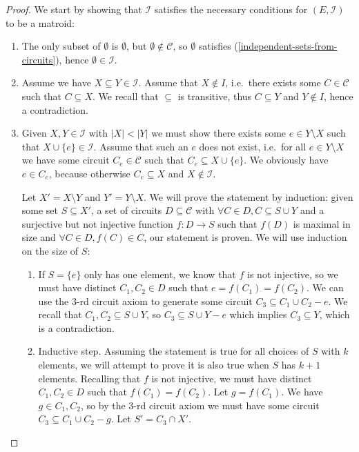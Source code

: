 \begin{proof} We start by showing that $\mathcal I $ satisfies the necessary conditions for $(E, \mathcal I )$ to be a matroid:
    \begin{enumerate} 
        \item The only subset of $\emptyset $ is $ \emptyset $, but $ \emptyset \not\in \mathcal C $, so $ \emptyset $ satisfies (\ref{independent-sets-from-circuits}), hence $\emptyset \in \mathcal I$.
    \item Assume we have $X \subseteq Y \in \mathcal I$. Assume that $X \not\in I$, i.e.\ there exists some $C \in \mathcal C $ such that $C \subseteq X$. We recall that $\subseteq $ is transitive, thus $C \subseteq Y$ and $Y \not\in I$, hence a contradiction.
    \item Given $X, Y \in \mathcal I $ with $|X| < |Y|$ we must show there exists some $e \in Y \setminus X$ such that $X \cup \{e\} \in \mathcal I$. Assume that such an $e$ does not exist, i.e.\ for all $e \in Y \setminus X$ we have some circuit $C _e \in \mathcal C $ such that $C _e \subseteq X \cup \{e\}$. We obviously have $e \in C_e$, because otherwise $C_e \subseteq X$ and $X \not\in \mathcal I$.


     Let $X' = X \setminus Y$ and $Y' = Y \setminus X$. We will prove the statement by induction: given some set $S \subseteq X'$, a set of circuits $D \subseteq \mathcal C$ with $\forall C \in D, C \subseteq  S \cup Y$ and a surjective but not injective function $f : D \to S$ such that $f(D)$ is maximal in size and $\forall C \in D, f(C) \in C$, our statement is proven. We will use induction on the size of $S$:
    \begin{enumerate}
      \item If $S = \{e\}$ only has one element, we know that $f$ is not injective, so we must have distinct $C _1, C _2 \in D$ such that $e = f(C _1 ) = f(C _2)$. We can use the $3$-rd circuit axiom to generate some circuit $C _3 \subseteq C _1 \cup C _2 - e$. We recall that $C _1 , C _2 \subseteq S \cup Y $, so $C _3 \subseteq S \cup Y - e$ which implies $C _3 \subseteq Y$, which is a contradiction.
        \item Inductive step. Assuming the statement is true for all choices of $S$ with $k$ elements, we will attempt to prove it is also true when $S$ has $k + 1$ elements. Recalling that $f$ is not injective, we must have distinct $C _1, C _2 \in D$ such that $f(C _1 ) = f(C _2)$. Let $g = f(C _1)$. We have $g \in C _1, C _2$, so by the $3$-rd circuit axiom we must have some circuit $C  _3 \subseteq C _1 \cup C _2 - g$. Let $S' = C _3 \cap X'$. 


\end{enumerate}
\end{enumerate}
\end{proof}
